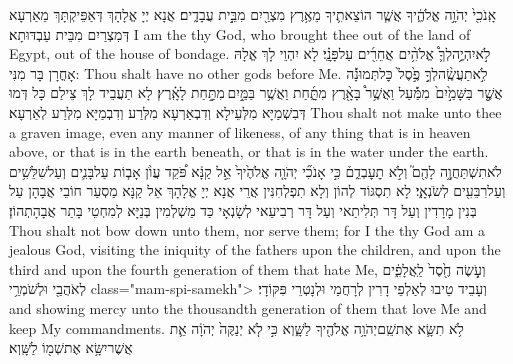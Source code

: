 {אָֽנֹכִ֖י֙ יְהֹוָ֣ה אֱלֹהֶ֑֔יךָ אֲשֶׁ֧ר הוֹצֵאתִ֛יךָ מֵאֶ֥רֶץ מִצְרַ֖יִם מִבֵּ֣֥ית עֲבָדִ֑͏ֽים׃}
{אֲנָא יְיָ אֱלָהָךְ דְּאַפֵּיקְתָּךְ מֵאַרְעָא דְּמִצְרַיִם מִבֵּית עַבְדּוּתָא׃}
{I am the \lord\space thy God, who brought thee out of the land of Egypt, out of the house of bondage.}{}
{לֹ֣א\maqqaf יִהְיֶ֥͏ֽה\maqqaf לְךָ֛֩ אֱלֹהִ֥֨ים אֲחֵרִ֖֜ים עַל\maqqaf פָּנָֽ͏ַ֗י׃}
{לָא יִהְוֵי לָךְ אֱלָהּ אָחֳרָן בָּר מִנִּי:}
{Thou shalt have no other gods before Me.}{}
{לֹֽ֣א\maqqaf תַעֲשֶֽׂ֨ה\maqqaf לְךָ֥֣ פֶ֣֙סֶל֙ \pasek  כׇּל\maqqaf תְּמוּנָ֔֡ה אֲשֶׁ֤֣ר בַּשָּׁמַ֣֙יִם֙ \pasek  מִמַּ֔֡עַל וַאֲשֶׁ֥ר֩ בָּאָ֖֨רֶץ מִתָּ֑͏ַ֜חַת וַאֲשֶׁ֥ר בַּמַּ֖֣יִם \legarmeh  מִתַּ֥֣חַת לָאָֽ֗רֶץ׃}
{לָא תַעֲבֵיד לָךְ צֵילַם כָּל דְּמוּ דְּבִשְׁמַיָּא מִלְּעֵילָא וְדִבְאַרְעָא מִלְּרַע וְדִבְמַיָּא מִלְּרַע לְאַרְעָא׃}
{Thou shalt not make unto thee a graven image, even any manner of likeness, of any thing that is in heaven above, or that is in the earth beneath, or that is in the water under the earth.}{}
{לֹא\maqqaf תִשְׁתַּחֲוֶ֥֣ה לָהֶ֖ם֮ וְלֹ֣א תׇעׇבְדֵ֑ם֒ כִּ֣י אָנֹכִ֞י יְהֹוָ֤ה אֱלֹהֶ֙יךָ֙ אֵ֣ל קַנָּ֔א פֹּ֠קֵד עֲוֺ֨ן אָב֧וֹת עַל\maqqaf בָּנִ֛ים וְעַל\maqqaf שִׁלֵּשִׁ֥ים וְעַל\maqqaf רִבֵּעִ֖ים לְשֹׂנְאָֽ֑י׃}
{לָא תִסְגּוֹד לְהוֹן וְלָא תִפְלְחִנִּין אֲרֵי אֲנָא יְיָ אֱלָהָךְ אֵל קַנָּא מַסְעַר חוֹבֵי אֲבָהָן עַל בְּנִין מָרָדִין וְעַל דָּר תְּלִיתַאי וְעַל דָּר רְבִיעַאי לְשָׂנְאָי כַּד מַשְׁלְמִין בְּנַיָּא לְמִחְטֵי בָּתַר אֲבָהָתְהוֹן׃}
{Thou shalt not bow down unto them, nor serve them; for I the \lord\space thy God am a jealous God, visiting the iniquity of the fathers upon the children, and upon the third and upon the fourth generation of them that hate Me,}{}
{וְעֹ֥֤שֶׂה חֶ֖֙סֶד֙ לַֽאֲלָפִ֑֔ים לְאֹהֲבַ֖י וּלְשֹׁמְרֵ֥י  class="mam-spi-samekh">\setuma }
{וְעָבֵיד טֵיבוּ לְאַלְפֵי דָרִין לְרָחֲמַי וּלְנָטְרֵי פִּקּוֹדָי׃}
{and showing mercy unto the thousandth generation of them that love Me and keep My commandments.}{}
{לֹ֥א תִשָּׂ֛א אֶת\maqqaf שֵֽׁם\maqqaf יְהֹוָ֥ה אֱלֹהֶ֖יךָ לַשָּׁ֑וְא כִּ֣י לֹ֤א יְנַקֶּה֙ יְהֹוָ֔ה אֵ֛ת אֲשֶׁר\maqqaf יִשָּׂ֥א אֶת\maqqaf שְׁמ֖וֹ לַשָּֽׁוְא׃ \setuma }
